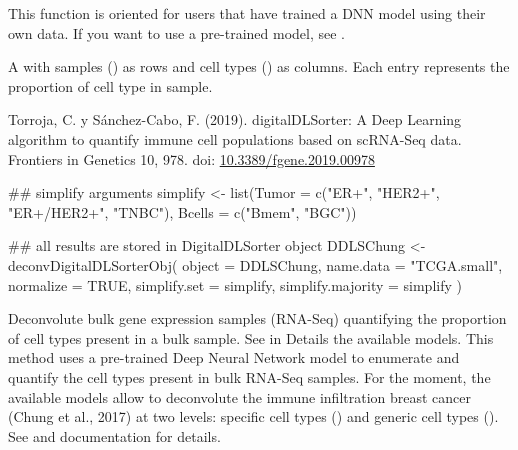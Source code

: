 \documentclass[a4paper]{book}
\begin{document}
%
\begin{Details}\relax
This function is oriented for users that have trained a DNN model using their
own data. If you want to use a pre-trained model, see
.
\end{Details}
%
\begin{Value}
A  with samples () as rows and cell types
() as columns. Each entry represents the proportion of  cell
type in  sample.
\end{Value}
%
\begin{References}\relax
Torroja, C. y Sánchez-Cabo, F. (2019). digitalDLSorter: A Deep
Learning algorithm to quantify immune cell populations based on scRNA-Seq
data. Frontiers in Genetics 10, 978. doi: \url{10.3389/fgene.2019.00978}
\end{References}
%
\begin{SeeAlso}\relax
{} 
\end{SeeAlso}
%
\begin{Examples}
\begin{ExampleCode}
## simplify arguments
simplify <- list(Tumor = c("ER+", "HER2+", "ER+/HER2+", "TNBC"),
                 Bcells = c("Bmem", "BGC"))

## all results are stored in DigitalDLSorter object
DDLSChung <- deconvDigitalDLSorterObj(
  object = DDLSChung,
  name.data = "TCGA.small",
  normalize = TRUE,
  simplify.set = simplify,
  simplify.majority = simplify
)

\end{ExampleCode}
\end{Examples}
%
\begin{Description}\relax
Deconvolute bulk gene expression samples (RNA-Seq) quantifying the proportion
of cell types present in a bulk sample. See in Details the available models.
This method uses a pre-trained Deep Neural Network model to enumerate and
quantify the cell types present in bulk RNA-Seq samples. For the moment, the
available models allow to deconvolute the immune infiltration breast cancer
(Chung et al., 2017) at two levels: specific cell types
() and generic cell types
(). See  and
 documentation for details.
\end{Description}
\end{document}
